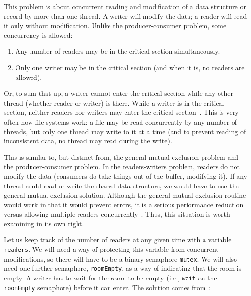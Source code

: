 \documentclass[a4paper]{report}
\begin{document}
This problem is about concurrent reading and modification of a data structure or record by more than one thread. A writer will modify the data; a reader will read it only without modification. Unlike the producer-consumer problem, some concurrency is allowed:

\begin{enumerate}
	\item Any number of readers may be in the critical section simultaneously.
	\item Only one writer may be in the critical section (and when it is, no readers are allowed).
\end{enumerate}

Or, to sum that up, a writer cannot enter the critical section while any other thread (whether reader or writer) is there. While a writer is in the critical section, neither readers nor writers may enter the critical section~\cite{lbs}. This is very often how file systems work: a file may be read concurrently by any number of threads, but only one thread may write to it at a time (and to prevent reading of inconsistent data, no thread may read during the write).

This is similar to, but distinct from, the general mutual exclusion problem and the producer-consumer problem. In the readers-writers problem, readers do not modify the data (consumers do take things out of the buffer, modifying it). If any thread could read or write the shared data structure, we would have to use the general mutual exclusion solution. Although the general mutual exclusion routine would work in that it would prevent errors, it is a serious performance reduction versus allowing multiple readers concurrently~\cite{osi}. Thus, this situation is worth examining in its own right.

Let us keep track of the number of readers at any given time with a variable \texttt{readers}. We will need a way of protecting this variable from concurrent modifications, so there will have to be a binary semaphore \texttt{mutex}. We will also need one further semaphore, \texttt{roomEmpty}, as a way of indicating that the room is empty. A writer has to wait for the room to be empty (i.e., \texttt{wait} on the \texttt{roomEmpty} semaphore) before it can enter. The solution comes from~\cite{lbs}:
\end{document}
